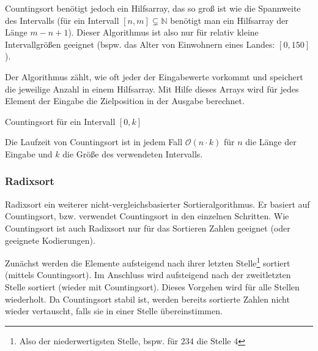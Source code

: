 Countingsort benötigt jedoch ein Hilfsarray, das so groß ist wie die Spannweite des Intervalls (für ein Intervall $[n,m] \subsetneq \mathbb{N}$ benötigt man ein Hilfsarray der Länge $m - n + 1$). Dieser Algorithmus ist also nur für relativ kleine Intervallgrößen geeignet (bspw. das Alter von Einwohnern eines Landes: $[0, 150]$).

Der Algorithmus zählt, wie oft jeder der Eingabewerte vorkommt und speichert die jeweilige Anzahl in einem Hilfsarray. Mit Hilfe dieses Arrays wird für jedes Element der Eingabe die Zielposition in der Ausgabe berechnet.

\begin{algorithm}
	\caption{Countingsort für ein Intervall $[0,k]$}
	\begin{algorithmic}
		\EndFor
		\EndFor
		 
		 
		\EndFor
		\EndProcedure
	\end{algorithmic}
\end{algorithm}

\begin{proposition}[Laufzeit]
	Die Laufzeit von Countingsort ist in jedem Fall $\mathcal{O}(n \cdot k)$ für $n$ die Länge der Eingabe und $k$ die Größe des verwendeten Intervalls.
\end{proposition}

\subsubsection{Radixsort}
Radixsort ein weiterer nicht-vergleichsbasierter Sortieralgorithmus. Er basiert auf Countingsort, bzw. verwendet Countingsort in den einzelnen Schritten. Wie Countingsort ist auch Radixsort nur für das Sortieren Zahlen geeignet (oder geeignete Kodierungen).

Zunächst werden die Elemente aufsteigend nach ihrer letzten Stelle\footnote{Also der niederwertigsten Stelle, bspw. für $234$ die Stelle $4$} sortiert (mittels Countingsort). Im Anschluss wird aufsteigend nach der zweitletzten Stelle sortiert (wieder mit Countingsort). Dieses Vorgehen wird für alle Stellen wiederholt. Da Countingsort stabil ist, werden bereits sortierte Zahlen nicht wieder vertauscht, falls sie in einer Stelle übereinstimmen.